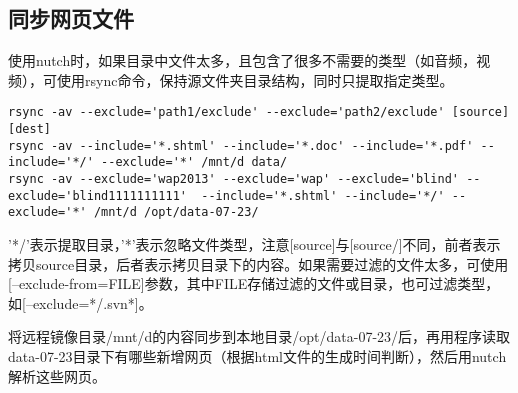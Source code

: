 \subsection{同步网页文件}
\par 使用nutch时，如果目录中文件太多，且包含了很多不需要的类型（如音频，视频），可使用rsync命令，保持源文件夹目录结构，同时只提取指定类型。
\begin{verbatim}
rsync -av --exclude='path1/exclude' --exclude='path2/exclude' [source] [dest]
rsync -av --include='*.shtml' --include='*.doc' --include='*.pdf' --include='*/' --exclude='*' /mnt/d data/
rsync -av --exclude='wap2013' --exclude='wap' --exclude='blind' --exclude='blind1111111111'  --include='*.shtml' --include='*/' --exclude='*' /mnt/d /opt/data-07-23/
\end{verbatim}
\par '*/'表示提取目录，'*'表示忽略文件类型，注意[source]与[source/]不同，前者表示拷贝source目录，后者表示拷贝目录下的内容。如果需要过滤的文件太多，可使用[--exclude-from=FILE]参数，其中FILE存储过滤的文件或目录，也可过滤类型，如[--exclude=*/.svn*]。
\par 将远程镜像目录/mnt/d的内容同步到本地目录/opt/data-07-23/后，再用程序读取data-07-23目录下有哪些新增网页（根据html文件的生成时间判断），然后用nutch解析这些网页。
